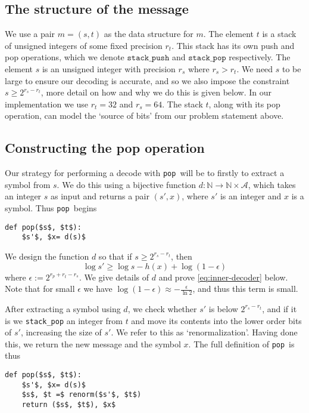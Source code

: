 \documentclass{article}
\newcommand{\pop}{\texttt{pop}}
\begin{document}
\subsection{The structure of the message}\label{sec:message}
We use a pair \(m = (s, t)\) as the data structure for \(m\). The element \(t\)
is a stack of unsigned integers of some fixed precision \(r_t\). This stack has
its own push and pop operations, which we denote \(\texttt{stack\_push}\) and
\(\texttt{stack\_pop}\) respectively. The element \(s\) is an unsigned integer
with precision \(r_s\) where \(r_s > r_t\). We need \(s\) to be large to ensure
our decoding is accurate, and so we also impose the constraint \(s\geq2^{r_s -
r_t}\), more detail on how and why we do this is given below. In our
implementation we use \(r_t = 32\) and \(r_s = 64\). The stack \(t\), along
with its pop operation, can model the `source of bits' from our problem
statement above.

\subsection{Constructing the pop operation}
Our strategy for performing a decode with \pop\ will be to firstly to extract a
symbol from \(s\). We do this using a bijective function \(d:\mathbb
N\rightarrow\mathbb N\times\mathcal{A}\), which takes an integer \(s\) as input
and returns a pair \((s', x)\), where \(s'\) is an integer and \(x\) is a
symbol.  Thus \pop\ begins
\begin{lstlisting}
def pop($s$, $t$):
    $s'$, $x= d(s)$
\end{lstlisting}
We design the function \(d\) so that if \(s\geq 2^{r_s - r_t}\), then
\begin{equation}\label{eq:inner-decoder}
  \log s'\geq\log s - h(x) + \log (1 - \epsilon)
\end{equation}
where \(\epsilon := 2^{r_p + r_t - r_s}\). We give details of \(d\) and prove
\cref{eq:inner-decoder} below. Note that for small \(\epsilon\) we have \(\log
(1 - \epsilon) \approx -\frac{\epsilon}{\ln2}\), and thus this term is small.

After extracting a symbol using \(d\), we check whether \(s'\) is below
\(2^{r_s - r_t}\), and if it is we \texttt{stack\_pop} an integer from \(t\)
and move its contents into the lower order bits of \(s'\), increasing the size
of \(s'\). We refer to this as `renormalization'. Having done this, we return
the new message and the symbol \(x\). The full definition of \pop\ is thus
\begin{lstlisting}
def pop($s$, $t$):
    $s'$, $x= d(s)$
    $s$, $t =$ renorm($s'$, $t$)
    return ($s$, $t$), $x$
\end{lstlisting}
\end{document}
